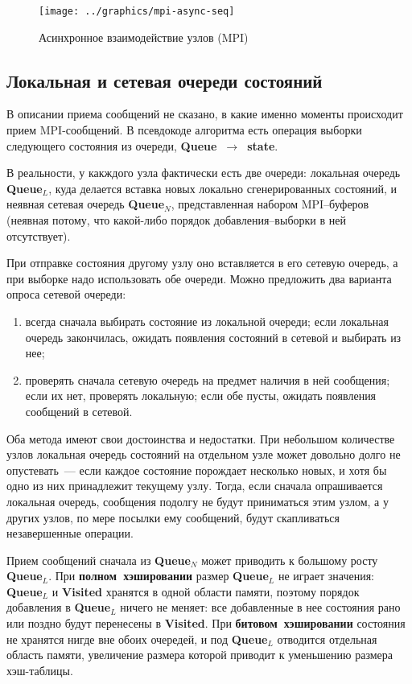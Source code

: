 \documentclass[12pt,a4paper,fleqn]{article}
\newcommand{\Code}[1]{\textbf{\mbox{#1}}}
\begin{document}
\begin{figure}[ht]
  \centering
  \texttt{[image: ../graphics/mpi-async-seq]}  
  \caption{Асинхронное взаимодействие узлов (MPI)}
  \label{fig:mpi-async-seq}
\end{figure}

\subsection{Локальная и сетевая очереди состояний}

В описании приема сообщений не сказано, в какие именно моменты происходит прием MPI-сообщений. В
псевдокоде алгоритма есть операция выборки следующего состояния из очереди, \Code{Queue
  $\rightarrow$ state}.

В реальности, у какждого узла фактически есть две очереди: локальная очередь \Code{Queue$_L$}, куда
делается вставка новых локально сгенерированных состояний, и неявная сетевая очередь
\Code{Queue$_N$}, представленная набором MPI--буферов (неявная потому, что какой-либо порядок
добавления--выборки в ней отсутствует).

При отправке состояния другому узлу оно вставляется в его сетевую очередь, а при выборке надо
использовать обе очереди. Можно предложить два варианта опроса сетевой очереди:
\begin{enumerate}
\item всегда сначала выбирать состояние из локальной очереди; если локальная очередь закончилась,
  ожидать появления состояний в сетевой и выбирать из нее;
\item проверять сначала сетевую очередь на предмет наличия в ней сообщения; если их нет, проверять
  локальную; если обе пусты, ожидать появления сообщений в сетевой.
\end{enumerate}

Оба метода имеют свои достоинства и недостатки. При небольшом количестве узлов локальная очередь
состояний на отдельном узле может довольно долго не опустевать~--- если каждое состояние порождает
несколько новых, и хотя бы одно из них принадлежит текущему узлу. Тогда, если сначала опрашивается
локальная очередь, сообщения подолгу не будут приниматься этим узлом, а у других узлов, по мере
посылки ему сообщений, будут скапливаться незавершенные операции.

Прием сообщений сначала из \Code{Queue$_N$} может приводить к большому росту \Code{Queue$_L$}. При
\Code{полном хэшировании} размер \Code{Queue$_L$} не играет значения: \Code{Queue$_L$} и
\Code{Visited} хранятся в одной области памяти, поэтому порядок добавления в \Code{Queue$_L$} ничего
не меняет: все добавленные в нее состояния рано или поздно будут перенесены в \Code{Visited}. При
\Code{битовом хэшировании} состояния не хранятся нигде вне обоих очередей, и под \Code{Queue$_L$}
отводится отдельная область памяти, увеличение размера которой приводит к уменьшению размера
хэш-таблицы.
\end{document}
